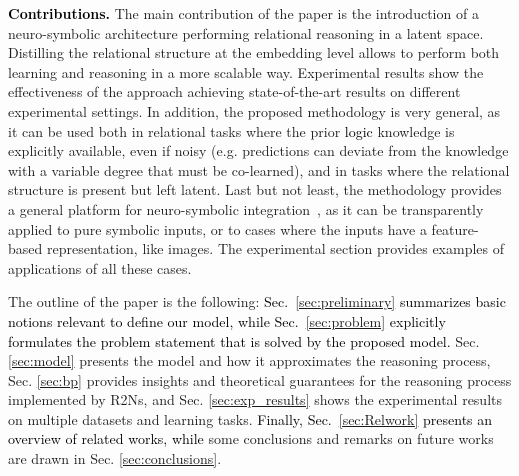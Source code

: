 \documentclass[journal]{IEEEtran}
\newcommand{\ar}[1]{\textcolor{black}{#1}}
\begin{document}
\ar{\textbf{Contributions.}} The main contribution of the paper is the introduction of a neuro-symbolic architecture performing relational reasoning in a latent space. Distilling the relational structure at the embedding level allows to perform both learning and reasoning in a more scalable way. Experimental results show the effectiveness of the approach achieving state-of-the-art results on different experimental settings.
In addition, the proposed methodology is very general, as it can be used  both in relational tasks where the prior \ar{logic} knowledge is explicitly available, even if noisy (e.g. predictions can deviate from the knowledge with a variable degree that must be co-learned), and in tasks where the relational structure is present but left latent. Last but not least, the methodology provides a general platform for neuro-symbolic integration~\cite{de2020statistical}, as it can be transparently applied to pure symbolic inputs, or to cases where the inputs have a feature-based representation, like images.
The experimental section provides examples of applications of all these cases.

The outline of the paper is the following:
\ar{Sec.~\ref{sec:preliminary} summarizes basic notions relevant to define our model, while Sec.~\ref{sec:problem} explicitly formulates the problem statement that is solved by the proposed model.} Sec. \ref{sec:model} presents the model
and how it approximates the reasoning process,
Sec. \ref{sec:bp} provides insights and theoretical guarantees for the reasoning process implemented by R2Ns, and Sec. \ref{sec:exp_results} shows the experimental results on multiple datasets and learning tasks. 
\ar{Finally, Sec.~\ref{sec:Relwork} presents an overview of related works, while} some conclusions and remarks on future works are drawn in Sec. \ref{sec:conclusions}.
\end{document}
